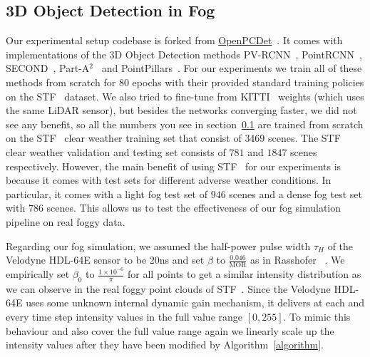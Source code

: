 \documentclass[10pt,twocolumn,letterpaper]{article}
\begin{document}
\subsection{3D Object Detection in Fog}
\label{sec:setup}

Our experimental setup codebase is forked from \hyperlink{https://github.com/open-mmlab/OpenPCDet}{OpenPCDet}~\cite{openpcdet2020}. 
It comes with implementations of the 3D Object Detection methods PV-RCNN~\cite{PV-RCNN}, PointRCNN~\cite{PRCNN}, SECOND~\cite{SECOND}, Part-A$^2$~\cite{PartA2} and PointPillars~\cite{PP}.
For our experiments we train all of these methods from scratch for $80$ epochs with their provided standard training policies on the STF~\cite{STF} dataset. 
We also tried to fine-tune from KITTI~\cite{KITTI} weights (which uses the same LiDAR sensor), but besides the networks converging faster, we did not see any benefit, so all the numbers you see in section~\ref{sec:setup} are trained from scratch on the STF~\cite{STF} clear weather training set that consist of $3469$ scenes.
The STF~\cite{STF} clear weather validation and testing set consists of $781$ and $1847$ scenes respectively. 
However, the main benefit of using STF~\cite{STF} for our experiments is because it comes with test sets for different adverse weather conditions. 
In particular, it comes with a light fog test set of $946$ scenes and a dense fog test set with $786$ scenes. 
This allows us to test the effectiveness of our fog simulation pipeline on real foggy data. 

Regarding our fog simulation, we assumed the half-power pulse width $\tau_H$ of the Velodyne HDL-64E sensor to be $20$ns and set $\beta$ to $\frac{0.046}{\text{MOR}}$ as in Rasshofer \etal~\cite{Rasshofer_2011}. We empirically set $\beta_0$ to $\frac{1 \times 10^{-6}}{\pi}$ for all points to get a similar intensity distribution as we can observe in the real foggy point clouds of STF~\cite{STF}. Since the Velodyne HDL-64E uses some unknown internal dynamic gain mechanism, it delivers at each and every time step intensity values in the full value range $[0, 255]$. To mimic this behaviour and also cover the full value range again we linearly scale up the intensity values after they have been modified by Algorithm~\ref{algorithm}. 
\end{document}
